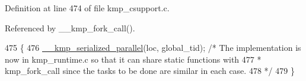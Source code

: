 Definition at line 474 of file kmp\-\_\-csupport.\-c.



Referenced by \-\_\-\-\_\-kmp\-\_\-fork\-\_\-call().


\begin{DoxyCode}
475 \{
476     \hyperlink{kmp_8h_ae2668589b9fe28c0a1e48b02a09c3c05}{\_\_kmp\_serialized\_parallel}(loc, global\_tid); \textcolor{comment}{/* The implementation is now in
       kmp\_runtime.c so that it can share static functions with}
477 \textcolor{comment}{                                                 * kmp\_fork\_call since the tasks to be done are similar in
       each case.}
478 \textcolor{comment}{                                                 */}
479 \}
\end{DoxyCode}

